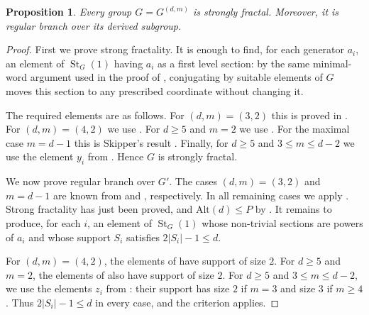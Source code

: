 \documentclass[11pt,leqno]{amsart}
\theoremstyle{plain}
\newtheorem{proposition}[proposition]{Proposition}
\DeclareMathOperator{\St}{St}
\newcommand{\alt}{\mathrm{Alt}}
\numberwithin{equation}{section}
\begin{document}
\begin{proposition}\label{propstronglyfract}
	Every group $G=G^{(d,m)}$ is strongly fractal. Moreover, it is regular branch over its derived subgroup.
\end{proposition}

\begin{proof}
 First we prove strong fractality. It is enough to find, for each generator $a_i$, an element of $\St_G(1)$ having $a_i$ as a first level section: by the same minimal-word argument used in the proof of , conjugating by suitable elements of $G$ moves this section to any prescribed coordinate without changing it.
	
	The required elements are as follows.  For $(d,m)=(3,2)$ this is proved in \cite[Example~4]{Sunic}. For $(d,m)=(4,2)$ we use . For $d\geq 5$ and $m=2$ we use . For the maximal case $m=d-1$ this is Skipper's result \cite[Theorem~3.16]{Rachel}. Finally, for $d\geq 5$ and $3\leq m\leq d-2$ we use the element $y_i$ from . Hence $G$ is strongly fractal.
	
	We now prove regular branch over $G'$. The cases $(d,m)=(3,2)$ and $m=d-1$ are known from \cite{Sunic} and \cite{Rachel}, respectively. In all remaining cases we apply . Strong fractality has just been proved, and $\alt(d)\leq P$ by . It remains to produce, for each $i$, an element of $\St_G(1)$ whose non-trivial sections are powers of $a_i$ and whose support $S_i$ satisfies $2|S_i|-1\leq d$.
	
	For $(d,m)=(4,2)$, the elements of  have support of size $2$. For $d\geq 5$ and $m=2$, the elements of  also have support of size $2$. For $d\geq 5$ and $3\leq m\leq d-2$, we use the elements $z_i$ from : their support has size $2$ if $m=3$ and size $3$ if $m\geq 4$. Thus $2|S_i|-1\leq d$ in every case, and the criterion applies.
\end{proof}
\end{document}
